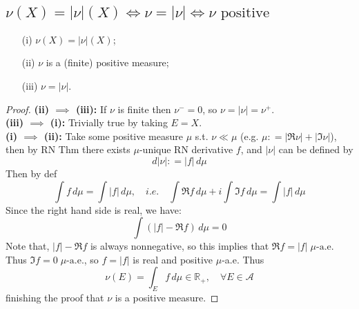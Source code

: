 \documentclass[lang=cn,11pt]{elegantbook}
\begin{document}
\subsection{$\nu(X)=|\nu|(X) \iff \nu =|\nu| \iff \nu  \text{ positive}$}
    \begin{itemize}
    \item[(i)]$\nu(X)=|\nu|(X)$; 
    \item[(ii)]      $\nu$ is a (finite) positive measure; 
    \item[(iii)]      $\nu=|\nu|$. 
  \end{itemize}
\begin{proof}
 \textbf{(ii) $\implies$ (iii):} If $\nu$ is finite then $\nu^- = 0$, so $\nu =  |\nu| = \nu^+$.\\
\textbf{(iii) $\implies$ (i):} Trivially true by taking $E = X$.\\
\textbf{(i) $\implies$ (ii):} Take some positive measure $\mu$ s.t.  $\nu \ll \mu$ (e.g. $\mu: =  |\Re \nu | + | \Im \nu |$), then by RN Thm there exists $\mu$-unique RN derivative $f$, and $|\nu|$ can be defined by \[
d |\nu|  : =  |f | \,d \mu
\]
Then by def \[ \int f \, d\mu  = \int |f| \, d\mu,\quad i.e.\quad \int \Re f \, d\mu   + i \int \Im f \, d\mu = \int |f| \, d\mu\]
Since the right hand side is real, we have:\[ \int ( |f| - \Re f) \, d\mu  =  0
\]
Note that, $|f| - \Re f$ is always nonnegative, so this implies that $\Re f = |f|\; \mu\text{-a.e.}$ \\
Thus $\Im f = 0\; \mu\text{-a.e.}$, so $f = |f|$ is real and positive $\mu$-a.e.
Thus \[
 \nu(E)  = \int_E f \, d\mu  \in \mathbb{R}_+,\quad \forall E\in\mathcal{A}
\]
finishing the proof that $\nu$ is a positive measure.
\end{proof}
\end{document}
